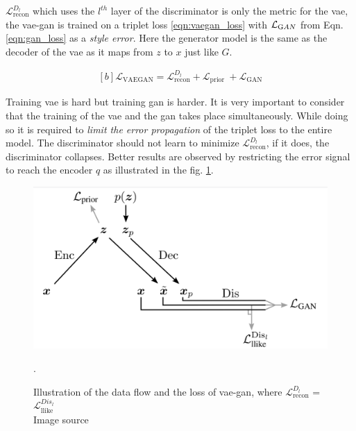$\mathcal{L}_{\text {recon}}^{D_{l}}$ which uses the $l^{th}$ layer of the discriminator is only the metric for the \ac{vae}, the \ac{vae}-\ac{gan} is trained on a triplet loss \ref{eqn:vaegan_loss} with $\mathcal{L}_{\text GAN}$ from Eqn. \ref{eqn:gan_loss} as a \textit{style error}. Here the generator model is the same as the decoder of the \ac{vae} as it maps from $z$ to $x$ just like $G$.

\begin{equation} \label{eqn:vaegan_loss}
    \begin{gathered}[b]
    \mathcal{L}_{\mathrm{VAEGAN}} = \mathcal{L}_{\text {recon}}^{D_{l}} +\mathcal{L}_{\text {prior }} + \mathcal{L}_{\text {GAN}}
    \end{gathered}
\end{equation}

Training \ac{vae} is hard but training \ac{gan} is harder. It is very important to consider that the training of the \ac{vae} and the \ac{gan} takes place simultaneously. While doing so it is required to \textit{limit the error propagation} of the triplet loss to the entire model. The discriminator should not learn to minimize $\mathcal{L}_{\text {recon}}^{D_{l}}$, if it does, the discriminator collapses. Better results are observed by restricting the error signal to reach the encoder $q$ as illustrated in the fig. \ref{fig:vaegan_loss_graph}. 

\begin{figure}[!h]
    \centering
    \includegraphics[scale=0.25]{figures/arch/vae_gan_loss_graph.png}
    \caption{Illustration of the data flow and the loss of \ac{vae}-\ac{gan}, where $\mathcal{L}_{\text {recon}}^{D_{l}}$ = $\mathcal{L}_{\text {llike}}^{Dis_{l}}$ \\
    Image source \cite{autoencoding_beyond_pixels}}. 
    \label{fig:vaegan_loss_graph}
\end{figure}

